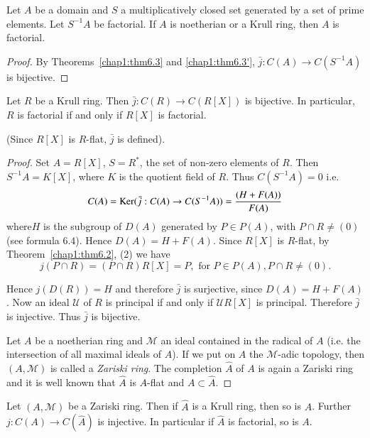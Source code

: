\begin{coro*} %
Let $A$ be a domain and $S$ a multiplicatively closed set generated by
a set of prime elements. Let $S^{-1} A$ be factorial. If $A$ is
noetherian or a Krull ring, then $A$ is factorial. 
\end{coro*}  
  
\begin{proof}
By Theorems~\ref{chap1:thm6.3} and \ref{chap1:thm6.3'}, $\bar{j} :
C(A) \rightarrow C(S^{-1}A)$ is 
bijective. 
\end{proof} 
   
\setcounter{theorem}{3}
  \begin{theorem}[Gauss]\label{chap1:thm6.4} %
 Let $R$ be a Krull ring. Then $\bar{j} : C(R) \rightarrow C(R [X])$
 is bijective. In particular, $R$ is factorial if and only if $R[X] $
 is factorial. 
  \end{theorem}  
  
(Since $R[X] $ is $R$-flat, $\bar{j}$ is defined).
  
\begin{proof}
Set $A = R[X]$, $S = R^*$, the set of non-zero elements of $R$. Then
$S^{-1} A = K [X]$, where $K$ is the quotient field of $R$. Thus
$C(S^{-1} A) = 0$ i.e. 
  $$
  C(A) = \operatorname{Ker} (\bar{j} : C(A) \rightarrow C(S^{-1}A)) = \frac{(H +
    F(A))}{F(A)} 
  $$
  where\pageoriginale $H$ is the subgroup of $D(A)$ generated by $P
  \in P(A)$, with 
  $P \cap R \neq (0)$ (see formula 6.4). Hence $D(A) = H +
  F(A)$. Since $R[X]$ is $R$-flat, by Theorem~\ref{chap1:thm6.2}, (2)
  we have  
  $$
  j(P \cap R) = (P \cap R) R[X] = P, \text{ for } P \in P(A), P \cap R \neq (0).
  $$
  
  \noindent
  Hence $j (D(R)) = H$ and therefore $\bar{j}$ is surjective, since
  $D(A) = H + F(A)$. Now an ideal $\mathscr{U}$ of $R$ is principal if
  and only if $\mathscr{U} R [X]$ is principal. Therefore $\bar{j}$ is
  injective. Thus $\bar{j}$ is bijective. 
  
  Let $A$ be a noetherian ring and $\mathscr{M}$ an ideal contained in
  the radical of $A$ (i.e. the intersection of all maximal ideals of
  $A$). If we put on $A$ the $\mathscr{M}$-adic topology, then
  $(A, \mathscr{M})$ is called a  \textit{Zariski ring}. The
  completion $\hat{A}$ of $A$ is again a Zariski ring and it is well
  known that $\hat{A}$ is $A$-flat and $A \subset \hat{A}$. 
\end{proof}

\setcounter{theorem}{4}
\begin{theorem}[Mori]\label{chap1:thm6.5} %
Let $(A, \mathscr{M})$ be a Zariski ring. Then if
    $\hat{A}$ is a Krull ring, then so is $A$. Further $j : C(A)
    \rightarrow C(\hat{A})$ is injective. In particular if $\hat{A}$
    is factorial, so is $A$. 
  \end{theorem}  
  

